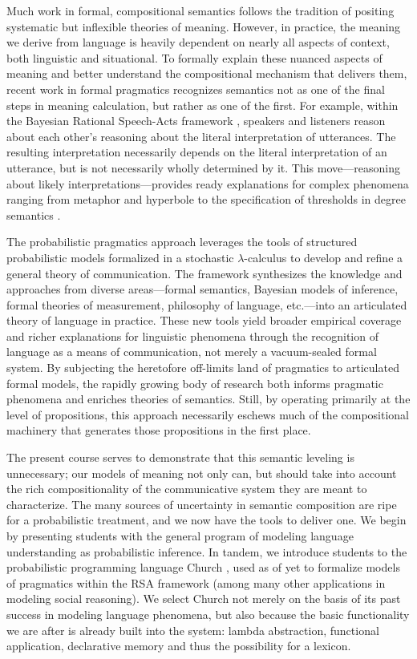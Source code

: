 \documentclass[11pt]{article}
\begin{document}
Much work in formal, compositional semantics follows the tradition of positing systematic but inflexible theories of meaning. However, in practice, the meaning we derive from language is heavily dependent on nearly all aspects of context, both linguistic and situational. To formally explain these nuanced aspects of meaning and better understand the compositional mechanism that delivers them, recent work in formal pragmatics recognizes semantics not as one of the final steps in meaning calculation, but rather as one of the first. For example, within the Bayesian Rational Speech-Acts framework \citep{frankgoodman2012,goodmanstuhlmuller2013}, speakers and listeners reason about each other's reasoning about the literal interpretation of utterances. The resulting interpretation necessarily depends on the literal interpretation of an utterance, but is not necessarily wholly determined by it. This move---reasoning about likely interpretations---provides ready explanations for complex phenomena ranging from metaphor and hyperbole \citep{kaoetal2014metaphor,kaoetal2014} to the specification of thresholds in degree semantics \citep{lassitergoodman2013}.

The probabilistic pragmatics approach leverages the tools of structured probabilistic models formalized in a stochastic $\lambda$-calculus to develop and refine a general theory of communication. The framework synthesizes the knowledge and approaches from diverse areas---formal semantics, Bayesian models of inference, formal theories of measurement, philosophy of language, etc.---into an articulated theory of language in practice. These new tools yield broader empirical coverage and richer explanations for linguistic phenomena through the recognition of language as a means of communication, not merely a vacuum-sealed formal system. By subjecting the heretofore off-limits land of pragmatics to articulated formal models, the rapidly growing body of research both informs pragmatic phenomena and enriches theories of semantics. Still, by operating primarily at the level of propositions, this approach necessarily eschews much of the compositional machinery that generates those propositions in the first place.

The present course serves to demonstrate that this semantic leveling is unnecessary; our models of meaning not only can, but should take into account the rich compositionality of the communicative system they are meant to characterize. The many sources of uncertainty in semantic composition are ripe for a probabilistic treatment, and we now have the tools to deliver one.
 We begin by presenting students with the general program of modeling language understanding as probabilistic inference. In tandem, we introduce students to the  probabilistic programming language Church \citep{goodmanetal2008church}, used as of yet to formalize models of pragmatics within the RSA framework (among many other applications in modeling social reasoning). We select Church not merely on the basis of its past success in modeling language phenomena, but also because the basic functionality we are after is already built into the system: lambda abstraction, functional application, declarative memory and thus the possibility for a lexicon.
\end{document}
